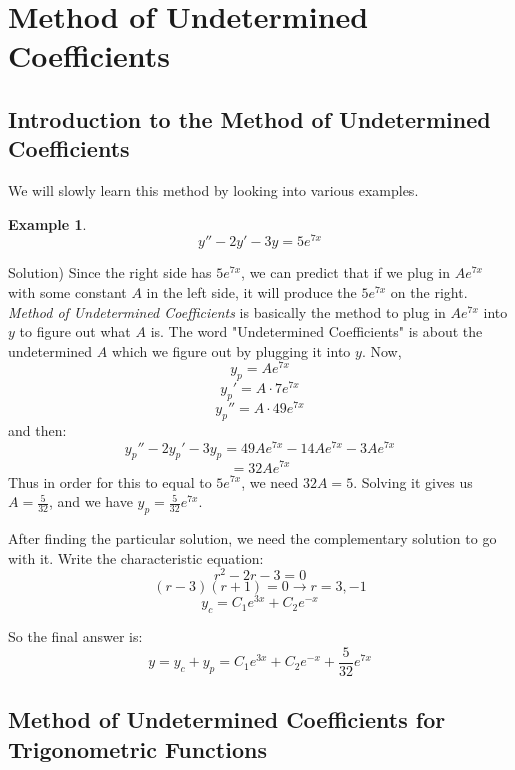 \documentclass[12pt]{report}
\newtheorem{ex}{Example}[section]
\begin{document}
\section{Method of Undetermined Coefficients}

\subsection*{ Introduction to the Method of Undetermined Coefficients }
We will slowly learn this method by looking into various examples.
\begin{ex}
$$y'' -2y' - 3y = 5 e^{7x} $$
\end{ex}
Solution)
Since the right side has $5 e^{7x}$, we can predict that if we plug in $A e^{7x}$ with some constant $A$ in the left side, it will produce the $5 e^{7x}$ on the right.
\textit{Method of Undetermined Coefficients} is basically the method to plug in $A e^{7x}$ into $y$ to figure out what $A$ is. The word "Undetermined Coefficients" is about the undetermined $A$ which we figure out by plugging it into $y$.
Now,
$$y_p = A e^{7x} $$
$$y_p' = A\cdot 7 e^{7x} $$
$$y_p''= A\cdot 49 e^{7x} $$
and then:
$$y_p'' - 2y_p' - 3y_p = 49 A e^{7x} - 14 A e^{7x} - 3 A e^{7x}$$
$$= 32 A e^{7x}$$
Thus in order for this to equal to $5 e^{7x}$, we need $ 32A = 5$. Solving it gives us $A= \frac{5}{32}$, and we have $y_p = \frac{5}{32}e^{7x}$.

After finding the particular solution, we need the complementary solution to go with it. Write the characteristic equation:
$$ r^2 -2r -3=0$$
$$(r-3)(r+1)=0 \rightarrow r=3, -1$$
$$y_c = C_1 e^{3x} + C_2 e^{-x}$$

So the final answer is:
$$y = y_c + y_p = C_1 e^{3x} + C_2 e^{-x}+\frac{5}{32}e^{7x}$$

\subsection*{ Method of Undetermined Coefficients for Trigonometric Functions}
\end{document}
